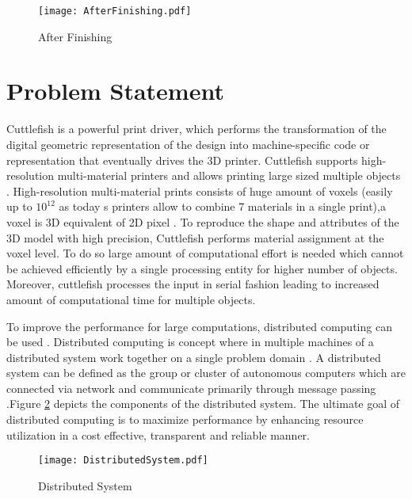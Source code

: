 \begin{figure}[ht!]
\centering
\texttt{[image: AfterFinishing.pdf]}
\caption{After Finishing}
\label{fig:AfterFinishing}
\end{figure}


\section{Problem Statement}

Cuttlefish \cite{cuttlefish} is a powerful print driver, which performs the transformation of the digital geometric representation of the design into machine-specific code or representation that eventually drives the 3D printer. Cuttlefish supports high-resolution multi-material printers and allows printing large sized multiple objects . High-resolution multi-material prints consists of huge amount of voxels (easily up to \begin{math}10^{12}\end{math} as today \textquotesingle s printers allow to combine 7 materials in a single print),a voxel is 3D equivalent of 2D pixel \cite{3DString}. To reproduce the shape and attributes of the 3D model with high precision, Cuttlefish performs material assignment at the voxel level. To do so large amount of computational effort is needed which cannot be achieved efficiently by a single processing entity for higher number of objects.  Moreover, cuttlefish processes the input in serial fashion leading to increased amount of computational time for multiple objects. \newline

To improve the performance for large computations, distributed computing can be used \cite{DistComp} \cite{Desai}.  Distributed computing is concept where in multiple machines of a distributed system work together on a single problem domain \cite{rouse}.  A distributed system can be defined as the group or cluster of autonomous computers which are connected via network and communicate primarily through message passing \cite{coulouris}.Figure \ref{fig:DS} depicts the components of the distributed system. The ultimate goal of distributed computing is to maximize performance by enhancing resource utilization in a cost effective, transparent and reliable manner.\newline

\begin{figure}[ht!]
\centering
\texttt{[image: DistributedSystem.pdf]}
\caption{Distributed System}
\label{fig:DS}
\end{figure}

